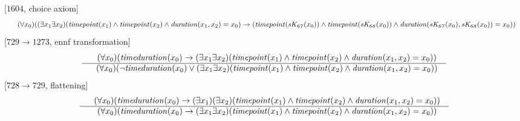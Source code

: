 \documentclass[border=10pt,preview,multi,varwidth=\maxdimen]{standalone}
\newenvironment{VampireStep}{}{}
\newenvironment{VampireInference}{%
   \begin{array}{c}}{\end{array}}
\newenvironment{VampirePremise}%
   {\begin{array}{l}}%
   {\end{array}}
\newenvironment{VampireConclusion}%
   {\begin{array}{l}}%
   {\end{array}}
\newcommand{\VConclusionSeparator}{\\ \hline}
\newcommand{\Vor}{\vee}
\newcommand{\Vand}{\wedge}
\newcommand{\Vimp}{\rightarrow}
\begin{document}
\begin{VampireStep}
[$1604$, choice axiom]\\
\[\begin{VampireInference}
\begin{VampireConclusion}
~~(\forall x_{0} )((\exists x_{1} \exists x_{2} )(\mathit{timepoint} (x_{1}) \Vand \mathit{timepoint} (x_{2}) \Vand \mathit{duration} (x_{1},x_{2}) = x_{0}) \Vimp (\mathit{timepoint} (\mathit{sK_{67}} (x_{0})) \Vand \mathit{timepoint} (\mathit{sK_{68}} (x_{0})) \Vand \mathit{duration} (\mathit{sK_{67}} (x_{0}),\mathit{sK_{68}} (x_{0})) = x_{0}))
\end{VampireConclusion}
\end{VampireInference}
\]
\end{VampireStep}
\begin{VampireStep}
[$729\rightarrow 1273$, ennf transformation]\\
\[\begin{VampireInference}
\begin{VampirePremise}%
~~(\forall x_{0} )(\mathit{timeduration} (x_{0}) \Vimp (\exists x_{1} \exists x_{2} )(\mathit{timepoint} (x_{1}) \Vand \mathit{timepoint} (x_{2}) \Vand \mathit{duration} (x_{1},x_{2}) = x_{0}))
\end{VampirePremise}
\VConclusionSeparator
\begin{VampireConclusion}
~~(\forall x_{0} )(\neg \mathit{timeduration} (x_{0}) \Vor (\exists x_{1} \exists x_{2} )(\mathit{timepoint} (x_{1}) \Vand \mathit{timepoint} (x_{2}) \Vand \mathit{duration} (x_{1},x_{2}) = x_{0}))
\end{VampireConclusion}
\end{VampireInference}
\]
\end{VampireStep}
\begin{VampireStep}
[$728\rightarrow 729$, flattening]\\
\[\begin{VampireInference}
\begin{VampirePremise}%
~~(\forall x_{0} )(\mathit{timeduration} (x_{0}) \Vimp (\exists x_{1} )(\exists x_{2} )(\mathit{timepoint} (x_{1}) \Vand \mathit{timepoint} (x_{2}) \Vand \mathit{duration} (x_{1},x_{2}) = x_{0}))
\end{VampirePremise}
\VConclusionSeparator
\begin{VampireConclusion}
~~(\forall x_{0} )(\mathit{timeduration} (x_{0}) \Vimp (\exists x_{1} \exists x_{2} )(\mathit{timepoint} (x_{1}) \Vand \mathit{timepoint} (x_{2}) \Vand \mathit{duration} (x_{1},x_{2}) = x_{0}))
\end{VampireConclusion}
\end{VampireInference}
\]
\end{VampireStep}
\end{document}

